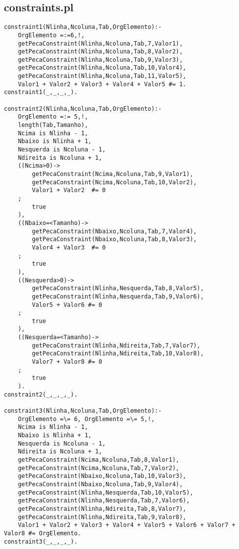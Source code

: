 \documentclass[runningheads]{llncs}
\begin{document}
\subsection{constraints.pl}
\begin{lstlisting}
constraint1(Nlinha,Ncoluna,Tab,OrgElemento):-
    OrgElemento =:=6,!,
    getPecaConstraint(Nlinha,Ncoluna,Tab,7,Valor1),
    getPecaConstraint(Nlinha,Ncoluna,Tab,8,Valor2),
    getPecaConstraint(Nlinha,Ncoluna,Tab,9,Valor3),
    getPecaConstraint(Nlinha,Ncoluna,Tab,10,Valor4),
    getPecaConstraint(Nlinha,Ncoluna,Tab,11,Valor5),
    Valor1 + Valor2 + Valor3 + Valor4 + Valor5 #= 1.
constraint1(_,_,_,_).

constraint2(Nlinha,Ncoluna,Tab,OrgElemento):-
    OrgElemento =:= 5,!,
    length(Tab,Tamanho),
    Ncima is Nlinha - 1,
    Nbaixo is Nlinha + 1,
    Nesquerda is Ncoluna - 1,
    Ndireita is Ncoluna + 1,
    ((Ncima>0)->
        getPecaConstraint(Ncima,Ncoluna,Tab,9,Valor1),
        getPecaConstraint(Ncima,Ncoluna,Tab,10,Valor2),
        Valor1 + Valor2  #= 0
    ;
        true
    ),
    ((Nbaixo=<Tamanho)->
        getPecaConstraint(Nbaixo,Ncoluna,Tab,7,Valor4),
        getPecaConstraint(Nbaixo,Ncoluna,Tab,8,Valor3),
        Valor4 + Valor3  #= 0
    ;
        true
    ),
    ((Nesquerda>0)->
        getPecaConstraint(Nlinha,Nesquerda,Tab,8,Valor5),
        getPecaConstraint(Nlinha,Nesquerda,Tab,9,Valor6),
        Valor5 + Valor6 #= 0
    ;
        true
    ),
    ((Nesquerda=<Tamanho)->
        getPecaConstraint(Nlinha,Ndireita,Tab,7,Valor7),
        getPecaConstraint(Nlinha,Ndireita,Tab,10,Valor8),
        Valor7 + Valor8 #= 0    
    ;
        true
    ).
constraint2(_,_,_,_).
    
constraint3(Nlinha,Ncoluna,Tab,OrgElemento):-
    OrgElemento =\= 6, OrgElemento =\= 5,!,
    Ncima is Nlinha - 1,
    Nbaixo is Nlinha + 1,
    Nesquerda is Ncoluna - 1,
    Ndireita is Ncoluna + 1,
    getPecaConstraint(Ncima,Ncoluna,Tab,8,Valor1),
    getPecaConstraint(Ncima,Ncoluna,Tab,7,Valor2),
    getPecaConstraint(Nbaixo,Ncoluna,Tab,10,Valor3),
    getPecaConstraint(Nbaixo,Ncoluna,Tab,9,Valor4),
    getPecaConstraint(Nlinha,Nesquerda,Tab,10,Valor5),
    getPecaConstraint(Nlinha,Nesquerda,Tab,7,Valor6),
    getPecaConstraint(Nlinha,Ndireita,Tab,8,Valor7),
    getPecaConstraint(Nlinha,Ndireita,Tab,9,Valor8),
    Valor1 + Valor2 + Valor3 + Valor4 + Valor5 + Valor6 + Valor7 + Valor8 #= OrgElemento.
constraint3(_,_,_,_).


\end{lstlisting}
\end{document}
